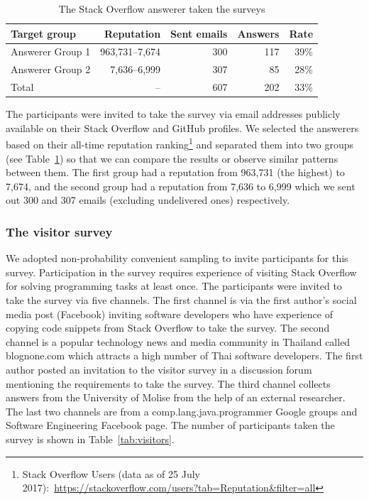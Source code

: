 \documentclass{svjour3}                     %
\begin{document}
\begin{table}
	\centering
	\caption{The Stack Overflow answerer taken the surveys}
	\label{tab:answerers}
	\begin{tabular}{lrrrr}
		\toprule
		Target group & Reputation & Sent emails & Answers & Rate \\
		\midrule
		Answerer Group 1 & 963,731--7,674 & 300 & 117 & 39\% \\
		Answerer Group 2 & 7,636--6,999 & 307 & 85 & 28\% \\
		\midrule
		Total & -- & 607 & 202 & 33\% \\
		\bottomrule
	\end{tabular}
\end{table}

The participants were invited to take the survey via email addresses publicly
available on their Stack Overflow and GitHub profiles. We selected the answerers
based on their all-time reputation ranking\footnote{Stack Overflow Users (data as of
	25 July 2017):~\url{https://stackoverflow.com/users?tab=Reputation&filter=all}}
and separated them into two groups (see Table~\ref{tab:answerers}) so that we
can compare the results or observe similar patterns between them. The first
group had a reputation from 963,731 (the highest) to 7,674, and the second group
had a reputation from 7,636 to 6,999 which we sent out 300 and 307 emails
(excluding undelivered ones) respectively. 

\subsubsection{The visitor survey} 
We adopted non-probability convenient sampling to invite participants for this
survey. Participation in the survey requires experience of visiting Stack
Overflow for solving programming tasks at least once. The participants were
invited to take the survey via five channels. The first channel is via the first
author's social media post (Facebook) inviting software developers who have
experience of copying code snippets from Stack Overflow to take the survey. The
second channel is a popular technology news and media community in Thailand
called \textsf{blognone.com} which attracts a high number of Thai software
developers. The first author posted an invitation to the visitor survey in a
discussion forum mentioning the requirements to take the survey. The third
channel collects answers from the University of Molise from the help of an
external researcher. The last two channels are from a
\textsf{comp.lang.java.programmer} Google groups and Software Engineering
Facebook page. The number of participants taken the survey is shown in
Table~\ref{tab:visitors}.
\end{document}
